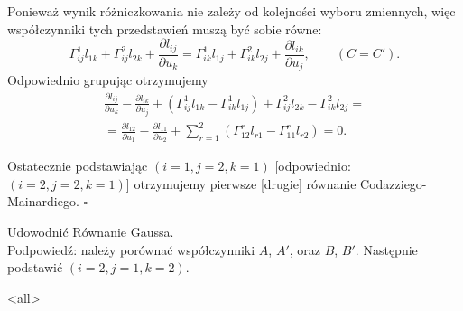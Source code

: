 \begin{frame}[<+->]

Ponieważ wynik różniczkowania nie zależy od kolejności wyboru zmiennych, więc współczynniki tych przedstawień muszą być sobie równe:
\[\Gamma^1_{ij}l_{1k}+\Gamma^2_{ij}l_{2k}+\frac{\partial l_{ij}}{\partial u_k}=\Gamma^1_{ik}l_{1j}+\Gamma^2_{ik}l_{2j}+\frac{\partial l_{ik}}{\partial u_j}, \qquad (C=C'). \]
\pause Odpowiednio grupując otrzymujemy
\begin{multline*}
\frac{\partial l_{ij}}{\partial u_k}-\frac{\partial l_{ik}}{\partial u_j}+\left(\Gamma^1_{ij}l_{1k}-\Gamma^1_{ik}l_{1j}\right)+\Gamma^2_{ij}l_{2k} -\Gamma^2_{ik}l_{2j}=\\
=\frac{\partial l_{12}}{\partial u_1}-\frac{\partial l_{11}}{\partial u_2} + 
\sum_{r=1}^2 \left( \Gamma^r_{12}l_{r1}-\Gamma^r_{11}l_{r2}\right)=0.
\end{multline*}


\pause Ostatecznie podstawiając $(i=1,j=2,k=1)$ [odpowiednio: $(i=2,j=2,k=1)$] otrzymujemy pierwsze [drugie] równanie Codazziego-Mainardiego. 
\hfill $\square$

\end{frame}
\begin{frame}[<+->]
\begin{exercise}
Udowodnić R\'ownanie Gaussa. \\
\footnotesize{Podpowiedź: należy porównać współczynniki $A$, $A'$, oraz  $B$,  $B'$.  Następnie podstawić $(i=2,j=1,k=2)$.}
\end{exercise}


\end{frame}
\mode<all>{}

